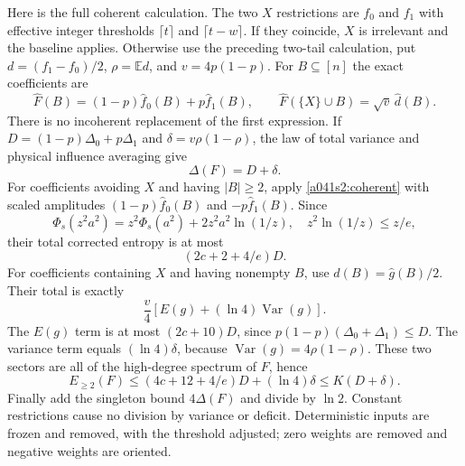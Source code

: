 Here is the full coherent calculation. The two $X$ restrictions are
$f_0$ and $f_1$ with effective integer thresholds $\lceil t\rceil$
and $\lceil t-w\rceil$. If they coincide, $X$ is irrelevant and the
baseline applies. Otherwise use the preceding two-tail calculation,
put $d=(f_1-f_0)/2$, $\rho=\mathbb E d$, and $v=4p(1-p)$.
For $B\subseteq[n]$ the exact coefficients are
\[
 \widehat F(B)=(1-p)\widehat f_0(B)+p\widehat f_1(B),\qquad
 \widehat F(\{X\}\cup B)=\sqrt v\,\widehat d(B).
\]
There is no incoherent replacement of the first expression. If
$D=(1-p)\Delta_0+p\Delta_1$ and $\delta=v\rho(1-\rho)$,
the law of total variance and physical influence averaging give
\begin{equation}\label{a041s2:ledger}
 \Delta(F)=D+\delta.
\end{equation}
For coefficients avoiding $X$ and having $|B|\ge2$, apply
\eqref{a041s2:coherent} with scaled amplitudes $(1-p)\widehat f_0(B)$
and $-p\widehat f_1(B)$. Since
\[
 \Phi_s(z^2a^2)=z^2\Phi_s(a^2)+2z^2a^2\ln(1/z),\quad
 z^2\ln(1/z)\le z/e,
\]
their total corrected entropy is at most
\[
 (2c+2+4/e)D.
\]
For coefficients containing $X$ and having nonempty $B$, use
$\widehat d(B)=\widehat g(B)/2$. Their total is exactly
\[
 \frac v4[E(g)+(\ln4)\operatorname{Var}(g)].
\]
The $E(g)$ term is at most $(2c+10)D$, since
$p(1-p)(\Delta_0+\Delta_1)\le D$. The variance term equals
$(\ln4)\delta$, because $\operatorname{Var}(g)=4\rho(1-\rho)$.
These two sectors are all of the high-degree spectrum of $F$, hence
\[
 E_{\ge2}(F)\le(4c+12+4/e)D+(\ln4)\delta
 \le K(D+\delta).
\]
Finally add the singleton bound $4\Delta(F)$ and divide by $\ln2$.
Constant restrictions cause no division by variance or deficit.
Deterministic inputs are frozen and removed, with the threshold adjusted;
zero weights are removed and negative weights are oriented.

